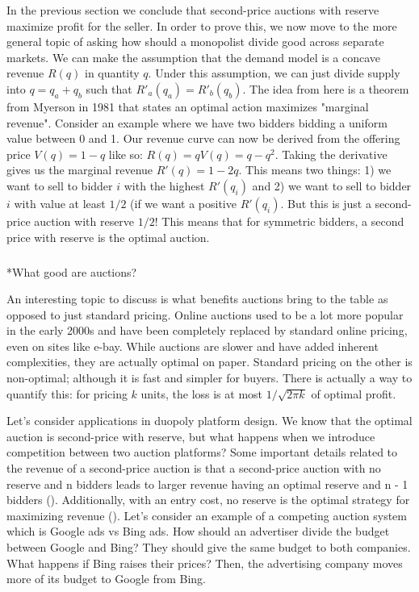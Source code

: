 \documentclass[
  letterpaper,
  numbers=noenddot,
  DIV=11]{scrreprt}
\makeatletter
\let\oldsubparagraph\subparagraph
\renewcommand{\subparagraph}{
    \@ifstar
      \xxxSubParagraphStar
      \xxxSubParagraphNoStar
  }
\newcommand{\xxxSubParagraphStar}[1]{\oldsubparagraph*{#1}\mbox{}}
\newcommand{\xxxSubParagraphNoStar}[1]{\oldsubparagraph{#1}\mbox{}}
\theoremstyle{plain}
\theoremstyle{definition}
\theoremstyle{plain}
\theoremstyle{remark}
\makeatother
\begin{document}
In the previous section we conclude that second-price auctions with
reserve maximize profit for the seller. In order to prove this, we now
move to the more general topic of asking how should a monopolist divide
good across separate markets. We can make the assumption that the demand
model is a concave revenue \(R(q)\) in quantity \(q\). Under this
assumption, we can just divide supply into \(q = q_a + q_b\) such that
\(R'_a(q_a) = R'_b(q_b)\). The idea from here is a theorem from Myerson
in 1981 that states an optimal action maximizes "marginal revenue".
Consider an example where we have two bidders bidding a uniform value
between 0 and 1. Our revenue curve can now be derived from the offering
price \(V(q) = 1 - q\) like so: \(R(q) = qV(q) = q - q^2\). Taking the
derivative gives us the marginal revenue \(R'(q) = 1-2q\). This means
two things: 1) we want to sell to bidder \(i\) with the highest
\(R'(q_i)\) and 2) we want to sell to bidder \(i\) with value at least
\(1/2\) (if we want a positive \(R'(q_i)\). But this is just a
second-price auction with reserve \(1/2\)! This means that for symmetric
bidders, a second price with reserve is the optimal auction.

\subparagraph*{What good are auctions?}\label{what-good-are-auctions}

An interesting topic to discuss is what benefits auctions bring to the
table as opposed to just standard pricing. Online auctions used to be a
lot more popular in the early 2000s and have been completely replaced by
standard online pricing, even on sites like e-bay. While auctions are
slower and have added inherent complexities, they are actually optimal
on paper. Standard pricing on the other is non-optimal; although it is
fast and simpler for buyers. There is actually a way to quantify this:
for pricing \(k\) units, the loss is at most \(1 / \sqrt{2\pi k}\) of
optimal profit.

Let's consider applications in duopoly platform design. We know that the
optimal auction is second-price with reserve, but what happens when we
introduce competition between two auction platforms? Some important
details related to the revenue of a second-price auction is that a
second-price auction with no reserve and n bidders leads to larger
revenue having an optimal reserve and n - 1 bidders
().
Additionally, with an entry cost, no reserve is the optimal strategy for
maximizing revenue ().
Let's consider an example of a competing auction system which is Google
ads vs Bing ads. How should an advertiser divide the budget between
Google and Bing? They should give the same budget to both companies.
What happens if Bing raises their prices? Then, the advertising company
moves more of its budget to Google from Bing.
\end{document}
